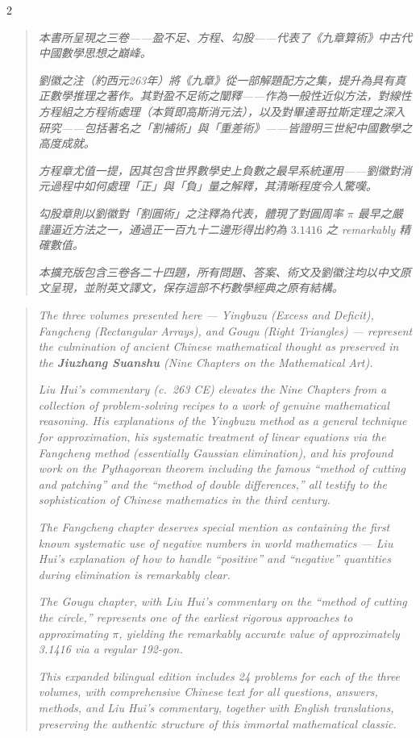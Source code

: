 \documentclass[11pt,a4paper]{article}
\begin{document}
\begin{paracol}{2}
\switchcolumn[0]
\begin{quote}
\textit{本書所呈現之三卷——盈不足、方程、勾股——代表了《九章算術》中古代中國數學思想之巔峰。}

\textit{劉徽之注（約西元263年）將《九章》從一部解題配方之集，提升為具有真正數學推理之著作。其對盈不足術之闡釋——作為一般性近似方法，對線性方程組之方程術處理（本質即高斯消元法），以及對畢達哥拉斯定理之深入研究——包括著名之「割補術」與「重差術》——皆證明三世紀中國數學之高度成就。}

\textit{方程章尤值一提，因其包含世界數學史上負數之最早系統運用——劉徽對消元過程中如何處理「正」與「負」量之解釋，其清晰程度令人驚嘆。}

\textit{勾股章則以劉徽對「割圓術」之注釋為代表，體現了對圓周率 $\pi$ 最早之嚴謹逼近方法之一，通過正一百九十二邊形得出約為 $3.1416$ 之 remarkably 精確數值。}

\textit{本擴充版包含三卷各二十四題，所有問題、答案、術文及劉徽注均以中文原文呈現，並附英文譯文，保存這部不朽數學經典之原有結構。}
\end{quote}

\switchcolumn[1]
\begin{quote}
\textit{The three volumes presented here --- Yingbuzu (Excess and Deficit), Fangcheng (Rectangular Arrays), and Gougu (Right Triangles) --- represent the culmination of ancient Chinese mathematical thought as preserved in the \textbf{Jiuzhang Suanshu} (Nine Chapters on the Mathematical Art).}

\textit{Liu Hui's commentary (c.~263 CE) elevates the Nine Chapters from a collection of problem-solving recipes to a work of genuine mathematical reasoning. His explanations of the Yingbuzu method as a general technique for approximation, his systematic treatment of linear equations via the Fangcheng method (essentially Gaussian elimination), and his profound work on the Pythagorean theorem including the famous ``method of cutting and patching'' and the ``method of double differences,'' all testify to the sophistication of Chinese mathematics in the third century.}

\textit{The Fangcheng chapter deserves special mention as containing the first known systematic use of negative numbers in world mathematics --- Liu Hui's explanation of how to handle ``positive'' and ``negative'' quantities during elimination is remarkably clear.}

\textit{The Gougu chapter, with Liu Hui's commentary on the ``method of cutting the circle,'' represents one of the earliest rigorous approaches to approximating $\pi$, yielding the remarkably accurate value of approximately 3.1416 via a regular 192-gon.}

\textit{This expanded bilingual edition includes 24 problems for each of the three volumes, with comprehensive Chinese text for all questions, answers, methods, and Liu Hui's commentary, together with English translations, preserving the authentic structure of this immortal mathematical classic.}
\end{quote}
\end{paracol}
\end{document}
